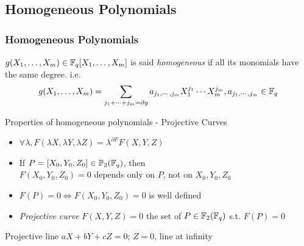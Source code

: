 \documentclass[10pt,handout]{beamer} %
\begin{document}
\subsection{Homogeneous Polynomials}
\begin{frame}
\frametitle{Homogeneous Polynomials}

\begin{Definition}
$g(X_1,\ldots,X_m)\in\mathbb F_q[X_1,\ldots,X_m]$ is said \emph{homogeneous}
if all its monomials have the same degree. {i.e.
$$g(X_1,\ldots,X_m)=\sum_{j_1+\cdots+j_m=\partial g}a_{j_1,\cdots,j_m}X_1^{j_1}\cdots X_m^{j_m}, a_{j_1,\cdots,j_m}\in\mathbb F_q$$}\vspace*{-2.4pt}
\end{Definition}\pause

\begin{beamerboxesrounded}[upper=block title,lower=block example,shadow=true]{Properties of homogeneous polynomials - Projective Curves}
\begin{itemize}[<+-| alert@+>]
 \item $\forall\lambda, F(\lambda X,\lambda Y,\lambda Z)=\lambda^{\partial F}F(X,Y,Z)$
 \item If $P=[X_0,Y_0,Z_0]\in\mathbb P_2(\mathbb F_q)$, then\\
$F(X_0,Y_0,Z_0)=0$ depends only on $P$, not on $X_0,Y_0,Z_0$
 \item $F(P)=0 \Leftrightarrow F(X_0,Y_0,Z_0)=0$ is well defined
 \item \emph{Projective curve} $F(X,Y,Z)=0$ the set of $P\in\mathbb F_2(\mathbb F_q)$ s.t. $F(P)=0$
\end{itemize}\pause
\end{beamerboxesrounded}

\begin{example}
 Projective line $aX+bY+cZ=0$;  $Z=0$, line at infinity
\end{example}
\end{frame}
\end{document}

